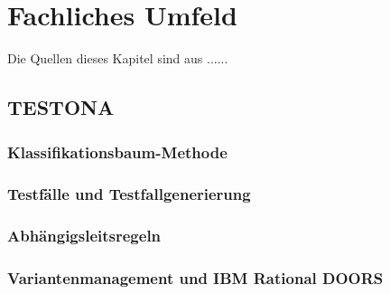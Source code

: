 \chapter{Fachliches Umfeld}\label{chp:fachlichesumfeld}
Die Quellen dieses Kapitel sind aus ......

\section{TESTONA}
\paragraph{}

\subsection{Klassifikationsbaum-Methode}
\paragraph{}

\subsection{Testfälle und Testfallgenerierung}
\paragraph{}



\subsection{Abhängigsleitsregeln}
\paragraph{}



\subsection{Variantenmanagement und IBM Rational DOORS}
